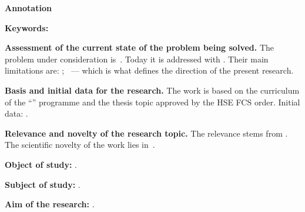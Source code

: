 \documentclass[12pt,a4paper]{extarticle}
\begin{document}
\sloppy



\begin{center}
  \textbf{\large Annotation}
\end{center}

\vspace{0.4em}

\noindent\textbf{Keywords:} 

\medskip
\noindent\textbf{Assessment of the current state of the problem being solved.} The problem under consideration is~. Today it is addressed with  \cite{example-en}. Their main limitations are: ; ~--- which is what defines the direction of the present research.

\medskip
\noindent\textbf{Basis and initial data for the research.} The work is based on the curriculum of the \enquote{\hseSpecialization} programme and the thesis topic approved by the HSE FCS order. Initial data: .

\medskip
\noindent\textbf{Relevance and novelty of the research topic.} The relevance stems from . The scientific novelty of the work lies in~.

\medskip
\noindent\textbf{Object of study:} .

\smallskip
\noindent\textbf{Subject of study:} .

\smallskip
\noindent\textbf{Aim of the research:} .
\end{document}
